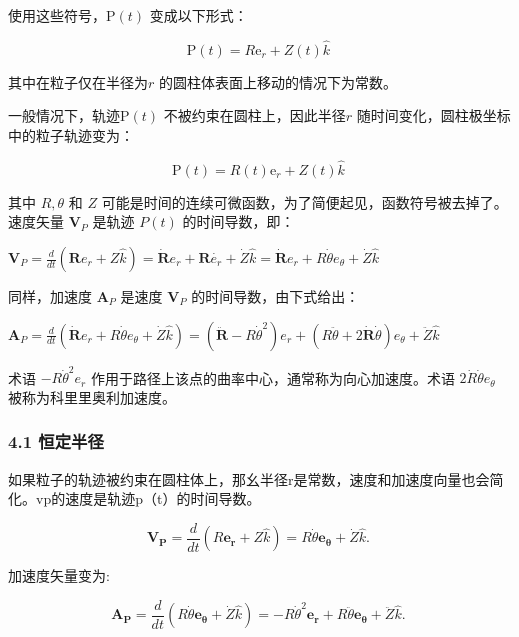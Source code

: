 使用这些符号，$\mathrm{P}(t)$ 变成以下形式：

\begin{equation}
\mathrm{P}(t) = R\mathrm{e}_r + Z(t)\hat{k}~
\end{equation}

其中在粒子仅在半径为$r$ 的圆柱体表面上移动的情况下为常数。

一般情况下，轨迹$\mathrm{P}(t)$ 不被约束在圆柱上，因此半径$r$ 随时间变化，圆柱极坐标中的粒子轨迹变为：

\begin{equation}
\mathrm{P}(t) = R(t)\mathrm{e}_r + Z(t)\hat{k}~
\end{equation}

其中 $R, \theta$ 和 $Z $ 可能是时间的连续可微函数，为了简便起见，函数符号被去掉了。速度矢量 $\mathbf{V}_P $ 是轨迹 $ P(t)$ 的时间导数，即：

$\mathbf{V}_P = \frac{d}{dt} (\mathbf{R}e_r + Z\hat{k}) = \dot{\mathbf{R}}e_r + \mathbf{R}\dot{e_r} + \dot{Z}\hat{k} = \dot{\mathbf{R}}e_r + R\dot{\theta}e_{\theta} + \dot{Z}\hat{k}$

同样，加速度 $\mathbf{A}_P $ 是速度 $\mathbf{V}_P $ 的时间导数，由下式给出：

$\mathbf{A}_P = \frac{d}{dt} (\dot{\mathbf{R}}e_r + R\dot{\theta}e_{\theta} + \dot{Z}\hat{k}) = (\ddot{\mathbf{R}} - R\dot{\theta}^2)e_r + (R\ddot{\theta} + 2\dot{\mathbf{R}}\dot{\theta})e_{\theta} + \ddot{Z}\hat{k}$

术语 $-R\dot{\theta}^2e_r$ 作用于路径上该点的曲率中心，通常称为向心加速度。术语 $2\dot{R}\dot{\theta}e_{\theta}$ 被称为科里里奥利加速度。

\subsubsection{4.1 恒定半径}

如果粒子的轨迹被约束在圆柱体上，那幺半径r是常数，速度和加速度向量也会简化。vp的速度是轨迹p（t）的时间导数。

\begin{equation}
\mathbf{V_P} = \frac{d}{dt} \left( R \mathbf{e_r} + Z \hat{k} \right) = R \dot{\theta} \mathbf{e_{\theta}} + \dot{Z} \hat{k}.~
\end{equation}

加速度矢量变为:

\begin{equation}
\mathbf{A_P} = \frac{d}{dt} \left( R \dot{\theta} \mathbf{e_{\theta}} + \dot{Z} \hat{k} \right) = - R \dot{\theta}^2 \mathbf{e_r} + R \ddot{\theta} \mathbf{e_{\theta}} + \ddot{Z} \hat{k}.~
\end{equation}

